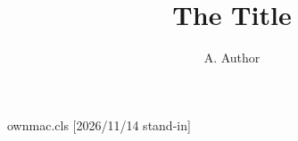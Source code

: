 \begin{filecontents*}[overwrite]{ownmac.cls}
[2026/11/14 stand-in]
\renewcommand\title[1]{\gdef\my@title{#1}}
\renewcommand\author[1]{\gdef\my@author{#1}}
\renewcommand\maketitle{{\centering{\Large\my@title\par}\my@author\par}}
\end{filecontents*}
\documentclass{ownmac}

\title{The Title}
\author{A. Author}
Dated May 14th.
\maketitle
Body.

